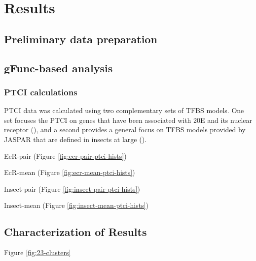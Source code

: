 

\chapter{Results} \label{chap:4}

\section{Preliminary data preparation}

\section{gFunc-based analysis}

\subsection{PTCI calculations}

\gls{PTCI} data was calculated using two complementary sets of \gls{TFBS} models.
One set focuses the \gls{PTCI} on genes that have been associated with \gls{20E} and its nuclear receptor (\PTCIe), and a second provides a general focus on \gls{TFBS} models provided by JASPAR that are defined in insects at large (\PTCIi).



EcR-pair (Figure \ref{fig:ecr-pair-ptci-hists})


EcR-mean (Figure \ref{fig:ecr-mean-ptci-hists})


Insect-pair (Figure \ref{fig:insect-pair-ptci-hists})


Insect-mean (Figure \ref{fig:insect-mean-ptci-hists})




\section{Characterization of Results}


Figure \ref{fig:23-clusters}

% 
% 
% 
% 
% 
% 
% 
% 



